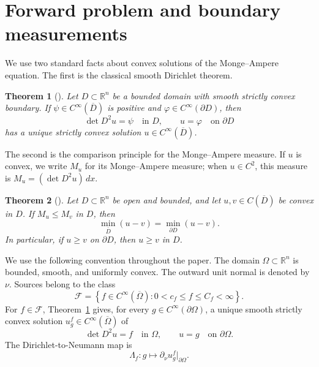 \documentclass[11pt]{article}
\numberwithin{equation}{section}
\newtheorem{theorem}{Theorem}[section]
\newcommand{\R}{\mathbb R}
\newcommand{\bd}{\partial}
\newcommand{\Om}{\Omega}
\newcommand{\DN}{\Lambda}
\begin{document}
\section{Forward problem and boundary measurements}\label{sec:forward}

We use two standard facts about convex solutions of the Monge--Ampere equation.  The first is the classical smooth Dirichlet theorem.

\begin{theorem}[{\cite[Theorem~1.1]{CaffarelliNirenbergSpruck1984}}]\label{thm:CNS-classical-dirichlet}
Let \(D\subset\R^n\) be a bounded domain with smooth strictly convex boundary.  If \(\psi\in C^\infty(\overline D)\) is positive and \(\varphi\in C^\infty(\partial D)\), then
\[
    \det D^2u=\psi
    \quad\text{in }D,
    \qquad
    u=\varphi
    \quad\text{on }\partial D
\]
has a unique strictly convex solution \(u\in C^\infty(\overline D)\). 
\end{theorem}

The second is the comparison principle for the Monge--Ampere measure.  If \(u\) is convex, we write \(M_u\) for its Monge--Ampere measure; when \(u\in C^2\), this measure is \(M_u=(\det D^2u)\,dx\).

\begin{theorem}[{\cite[Theorem~1.4.6]{Gutierrez2016}}]\label{thm:MA-comparison}
Let \(D\subset\R^n\) be open and bounded, and let \(u,v\in C(\overline D)\) be convex in \(D\).  If \(M_u\le M_v\) in \(D\), then
\[
    \min_{\overline D}(u-v)=\min_{\partial D}(u-v).
\]
In particular, if \(u\ge v\) on \(\partial D\), then \(u\ge v\) in \(D\).
\end{theorem}

We use the following convention throughout the paper.  The domain \(\Om\subset\R^n\) is bounded, smooth, and uniformly convex.  The outward unit normal is denoted by \(\nu\).  Sources belong to the class
\begin{equation}\label{eq:source-class}
    \mathcal F
    =
    \left\{
        f\in C^\infty(\overline\Om):
        0<c_f\le f\le C_f<\infty
    \right\}.
\end{equation}
For \(f\in\mathcal F\), Theorem~\ref{thm:CNS-classical-dirichlet} gives, for every \(g\in C^\infty(\bd\Om)\), a unique smooth strictly convex solution \(u_g^f\in C^\infty(\overline\Om)\) of
\begin{equation}\label{eq:admissible-dirichlet-problem}
    \det D^2u=f
    \quad\text{in }\Om,
    \qquad
    u=g
    \quad\text{on }\bd\Om .
\end{equation}
The Dirichlet-to-Neumann map is
\begin{equation}\label{eq:DN-definition}
    \DN_f:g\mapsto \partial_\nu u_g^f|_{\bd\Om}.
\end{equation}
\end{document}
